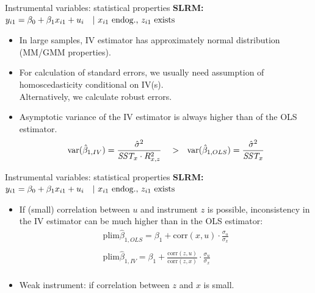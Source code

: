 \documentclass[usenames,dvipsnames]{beamer}
\begin{document}
\begin{frame}{Instrumental variables: statistical properties}
\textbf{SLRM:} $y_{i1} = \beta_0 + \beta_1 x_{i1} + u_i \quad |~x_{i1} \textnormal{~endog.,~} z_{i1} \textnormal{~exists}$
\medskip
\begin{itemize}
\item In large samples, IV estimator has approximately normal distribution (MM/GMM properties). 
\medskip
\item For calculation of standard errors, we usually need assumption of homoscedasticity conditional on IV(s).\\ Alternatively, we calculate robust errors. 
\medskip
\item Asymptotic variance of the IV estimator is always higher than  of the OLS estimator. 
$$ \textnormal{var}(\hat{\beta}_{1,IV})=\frac{\hat{\sigma}^2}{\textit{SST}_{x} \cdot R^2_{x,z}} ~~~>~~
\textnormal{var}(\hat{\beta}_{1,OLS})=\frac{\hat{\sigma}^2}{\textit{SST}_x}$$
\end{itemize}
\end{frame}
\begin{frame}{Instrumental variables: statistical properties}
\textbf{SLRM:} $y_{i1} = \beta_0 + \beta_1 x_{i1} + u_i \quad |~x_{i1} \textnormal{~endog.,~} z_{i1} \textnormal{~exists}$
\medskip
\begin{itemize}
\item If (small) correlation between $u$ and instrument $z$ is possible, inconsistency in the IV estimator can be much higher than in the OLS estimator:
\vspace{0.3cm}
\begin{align*}
\mathrm{plim}\hat{\beta}_{1, OLS} = \beta_1 + \mathrm{corr}(x, u) \cdot \frac{\sigma_u}{\sigma_x} \\
~\\
\mathrm{plim}\hat{\beta}_{1, IV} = \beta_1 + \frac{\mathrm{corr}(z, u)}{\mathrm{corr}(z, x)} \cdot \frac{\sigma_u}{\sigma_x} \\
\end{align*}
\item Weak instrument: if correlation between  $z$ and $x$ is small.
\end{itemize}
\end{frame}
\end{document}
